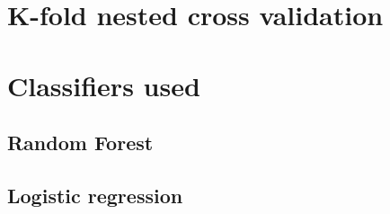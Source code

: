 \section{K-fold nested cross validation}
\section{Classifiers used}
\subsection{Random Forest}
\subsection{Logistic regression}
